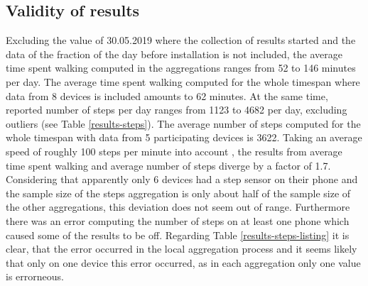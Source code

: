 \subsection{Validity of results}
Excluding the value of 30.05.2019 where the collection of results started and the data of the fraction of the day before installation is not included, the average time spent walking computed in the aggregations ranges from 52 to 146 minutes per day. The average time spent walking computed for the whole timespan where data from 8 devices is included amounts to 62 minutes. At the same time, reported number of steps per day ranges from 1123 to 4682 per day, excluding outliers (see Table \ref{results-steps}). The average number of steps computed for the whole timespan with data from 5 participating devices is 3622. Taking an average speed of roughly 100 steps per minute into account \parencite{steps2}, the results from average time spent walking and average number of steps diverge by a factor of 1.7. Considering that apparently only 6 devices had a step sensor on their phone and the sample size of the steps aggregation is only about half of the sample size of the other aggregations, this deviation does not seem out of range. Furthermore there was an error computing the number of steps on at least one phone which caused some of the results to be off. Regarding Table \ref{results-steps-listing} it is clear, that the error occurred in the local aggregation process and it seems likely that only on one device this error occurred, as in each aggregation only one value is errorneous.

